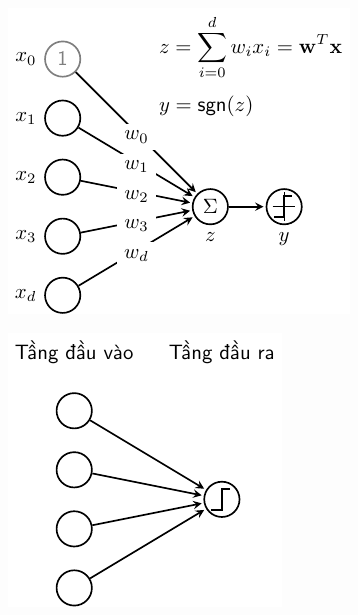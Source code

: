 \begin{figure}[h]
    \begin{subfigure}{0.359\textwidth}
    \includegraphics[width=1.02\linewidth]{Chapters/05_NeuralNetworks/09_perceptron/latex/pla_nn_a.pdf}
    \caption{}
    \label{fig:9_pla_lr_nna}
    \end{subfigure}
    \begin{subfigure}{0.3\textwidth}
    \includegraphics[width=1.02\linewidth]{Chapters/05_NeuralNetworks/09_perceptron/latex/pla_nn_b.pdf}

\end{subfigure}
\end{figure}
